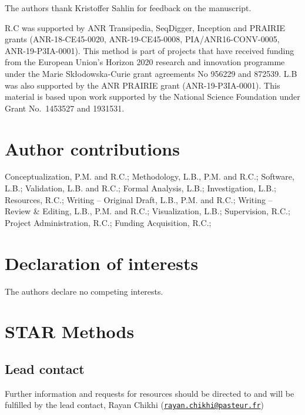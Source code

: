 \documentclass[
  11pt,
  twoside,
  BCOR=10mm,
  listof=totoc]{scrbook}
\begin{document}
The authors thank Kristoffer Sahlin for feedback on the manuscript.

R.C was supported by ANR Transipedia, SeqDigger, Inception and PRAIRIE grants (ANR-18-CE45-0020, ANR-19-CE45-0008, PIA/ANR16-CONV-0005, ANR-19-P3IA-0001). This method is part of projects that have received funding from the European Union's Horizon 2020 research and innovation programme under the Marie Skłodowska-Curie grant agreements No 956229 and 872539. L.B was also supported by the ANR PRAIRIE grant (ANR-19-P3IA-0001). This material is based upon work supported by the National Science Foundation under Grant No.~1453527 and 1931531.

\hypertarget{author-contributions}{%
\section*{Author contributions}\label{author-contributions}}

Conceptualization, P.M. and R.C.; Methodology, L.B., P.M. and R.C.; Software, L.B.; Validation, L.B. and R.C.; Formal Analysis, L.B.; Investigation, L.B.; Resources, R.C.; Writing -- Original Draft, L.B., P.M. and R.C.; Writing -- Review \& Editing, L.B., P.M. and R.C.; Visualization, L.B.; Supervision, R.C.; Project Administration, R.C.; Funding Acquisition, R.C.;

\hypertarget{declaration-of-interests}{%
\section*{Declaration of interests}\label{declaration-of-interests}}

The authors declare no competing interests.

\hypertarget{star-methods}{%
\section*{STAR Methods}\label{star-methods}}

\hypertarget{lead-contact}{%
\subsection*{Lead contact}\label{lead-contact}}

Further information and requests for resources should be directed to and will be fulfilled by the lead contact, Rayan Chikhi (\href{mailto:rayan.chikhi@pasteur.fr}{\nolinkurl{rayan.chikhi@pasteur.fr}})
\end{document}
